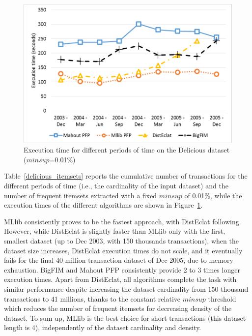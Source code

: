 \begin{figure}[!t]
\includegraphics[width=5in]{chapters/survey/immagini/delicious.png}
\caption{Execution time for different periods of time on the Delicious dataset
($minsup$=0.01\%)}
\label{delicious}
\end{figure}


Table~\ref{delicious_itemsets} reports the cumulative number of
transactions for the different periods of time
(i.e., the cardinality of the input dataset) and the
number of frequent itemsets extracted with a fixed $minsup$ of 0.01\%,
while the execution times of the
different algorithms are shown in Figure~\ref{delicious}.


MLlib consistently proves to be the fastest approach, with DistEclat following.
However, while DistEclat is slightly faster than MLlib only with the first, smallest dataset
(up to Dec 2003, with 150 thousands transactions), when the dataset size increases,
DistEclat execution times do not scale, and it eventually fails for the final
40-million-transaction dataset of Dec 2005, due to memory exhaustion.
BigFIM and Mahout PFP consistently provide 2 to 3 times longer execution times.
Apart from DistEclat, all algorithms complete the task with similar performance
despite increasing the dataset cardinality from 150 thousand transactions to 41 millions,
thanks to the constant relative $minsup$ threshold
which reduces the number of frequent itemsets
for decreasing density of the dataset.
To sum up, MLlib is the best choice for short transactions
(this dataset length is 4),
independently of the dataset cardinality and density.


